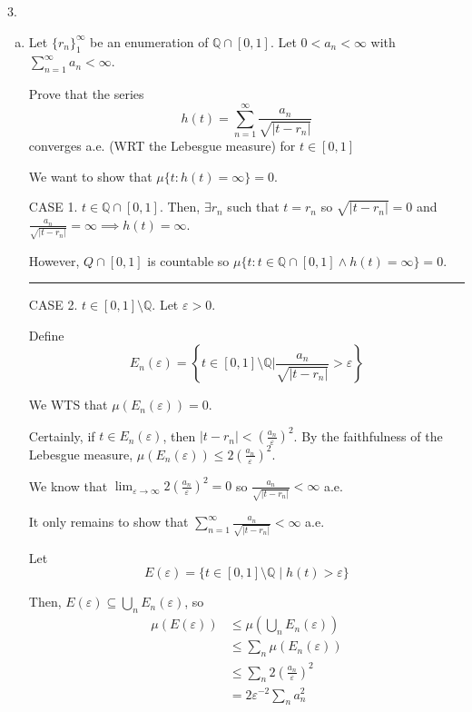 \documentclass[12pt]{report}
\newcommand{\Q}{\mathbb{Q}}
\newcommand{\abs}[1]{\left\vert #1 \right\vert}
\newcommand{\ep}{\varepsilon}
\newcommand{\sub}{\subseteq}
\renewcommand{\div}{\vspace*{10pt}\hrule\vspace*{10pt}}
\begin{document}
3. 
\begin{enumerate}[(a)]
    \item Let $\{r_n\}_1^{\infty}$ be an enumeration of $\Q \cap [0, 1]$. Let $0 < a_n < \infty$ with $\sum_{n=1}^{\infty} a_n < \infty$.

    Prove that the series 
    \[h(t) = \sum_{n=1}^\infty \frac{a_n}{\sqrt{\abs{t - r_n}}}\]
    converges a.e. (WRT the Lebesgue measure) for $t \in [0,1]$ 

        \color{blue}
            We want to show that $\mu\{t: h(t) = \infty\} = 0$.

            CASE 1. $t \in \Q \cap [0, 1]$. Then, $\exists r_n$ such that $t = r_n$ so $\sqrt{\abs{t - r_n}} = 0$ and $\frac{a_n}{\sqrt{\abs{t - r_n}}} = \infty \implies h(t) = \infty$. 

            However, $Q \cap [0, 1]$ is countable so $\mu\{t: t \in \Q \cap [0, 1] \land h(t) = \infty\} = 0$.

            \div

            CASE 2. $t \in [0, 1] \setminus \Q$. Let $\ep > 0$.

            Define 
            \[E_n(\ep) = \left\{t \in [0, 1] \setminus \Q \bigg\vert \frac{a_n}{\sqrt{\abs{t - r_n}}} > \ep\right\}\]

            We WTS that $\mu(E_n(\ep)) = 0$.  

            Certainly, if $t \in E_n(\ep)$, then $\abs{t - r_n} < (\frac{a_n}{\ep})^2$. By the faithfulness of the Lebesgue measure, $\mu(E_n(\ep)) \leq 2(\frac{a_n}{\ep})^2$. 

            We know that $\lim_{\ep \to \infty} 2(\frac{a_n}{\ep})^2 = 0$ so $\frac{a_n}{\sqrt{\abs{t - r_n}}} < \infty$ a.e. 

            It only remains to show that $\sum_{n=1}^{\infty} \frac{a_n}{\sqrt{\abs{t - r_n}}} < \infty$ a.e.

            Let 
            \[E(\ep) = \{t \in [0, 1] \setminus \Q \; | \; h(t) > \ep\}\]

            Then, $E(\ep) \sub \bigcup_n E_n(\ep)$, so 
            \begin{align*}
                \mu(E(\ep)) &\leq \mu\left(\bigcup_n E_n(\ep)\right)\\ 
                &\leq \sum_n \mu(E_n(\ep))\\
                &\leq \sum_n 2(\frac{a_n}{\ep})^2\\
                &= 2\ep^{-2} \sum_n a_n^2
            \end{align*}


\end{enumerate}
\end{document}
